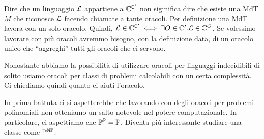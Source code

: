 Dire che un linguaggio $\mathcal{L}$ appartiene a $\mathbb{C}^{\mathbb{C}'}$ non siginifica dire che esiste una
MdT $M$ che riconosce $\mathcal{L}$ facendo chiamate a tante oracoli. Per definizione una MdT lavora con
un solo oracolo. Quindi, $\mathcal{L} \in \mathbb{C}^{\mathbb{C}'} \iff \exists O \in \mathbb{C}'. \mathcal{L} \in
\mathbb{C}^{O}$. Se volessimo lavorare con più oracoli avremmo bisogno, con la definizione data, di un
oracolo unico che ``aggreghi'' tutti gli oracoli che ci servono.

Nonostante abbiamo la possibilità di utilizzare oracoli per linguaggi indecidibili di solito usiamo
oracoli per classi di problemi calcolabili con un certa complessità. Ci chiediamo quindi quanto ci
aiuti l'oracolo. 

In prima battuta ci si aspetterebbe che lavorando con degli oracoli per problemi polinomiali non
otteniamo un salto notevole nel potere computazionale. In particolare, ci aspettiamo che
$\mathbb{P}^{\mathbb{P}} =
\mathbb{P}$. Diventa più interessante studiare una classe come $\mathbb{P}^{\mathbb{NP}}$.

